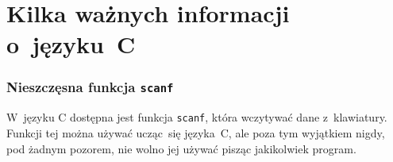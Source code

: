 \documentclass[10pt,t]{beamer}
\begin{document}
\section{Kilka ważnych informacji o~języku~C}



\begin{frame}
  \frametitle{Nieszczęsna funkcja \texttt{scanf}}


  W~języku C dostępna jest funkcja \texttt{scanf}, która wczytywać dane
  z~klawiatury. Funkcji tej można używać ucząc~się języka~C, ale poza
  tym wyjątkiem \alert{nigdy}, \alert{pod żadnym pozorem}, \alert{nie wolno}
  jej używać pisząc jakikolwiek program.

\end{frame}





















































\printbibliography





\end{document}
